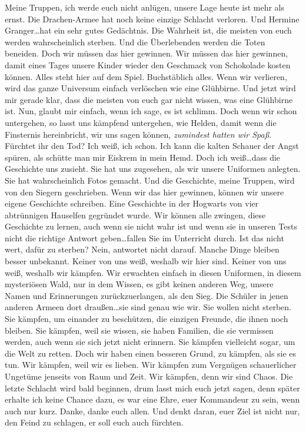 Meine Truppen, ich werde euch nicht anlügen, unsere Lage heute ist mehr als ernst. Die Drachen-Armee hat noch keine einzige Schlacht verloren. Und Hermine Granger…hat ein sehr gutes Gedächtnis. Die Wahrheit ist, die meisten von euch werden wahrscheinlich sterben. Und die Überlebenden werden die Toten beneiden. Doch wir müssen das hier gewinnen. Wir müssen das hier gewinnen, damit eines Tages unsere Kinder wieder den Geschmack von Schokolade kosten können. Alles steht hier auf dem Spiel. Buchstäblich alles. Wenn wir verlieren, wird das ganze Universum einfach verlöschen wie eine Glühbirne. Und jetzt wird mir gerade klar, dass die meisten von euch gar nicht wissen, was eine Glühbirne ist. Nun, glaubt mir einfach, wenn ich sage, es ist schlimm. Doch wenn wir schon untergehen, so lasst uns kämpfend untergehen, wie Helden, damit wenn die Finsternis hereinbricht, wir uns sagen können, \emph{zumindest hatten wir Spaß}. Fürchtet ihr den Tod? Ich weiß, ich schon. Ich kann die kalten Schauer der Angst spüren, als schütte man mir Eiskrem in mein Hemd. Doch ich weiß…dass die Geschichte uns zusieht. Sie hat uns zugesehen, als wir unsere Uniformen anlegten. Sie hat wahrscheinlich Fotos gemacht. Und die Geschichte, meine Truppen, wird von den Siegern geschrieben. Wenn wir das hier gewinnen, können wir unsere eigene Geschichte schreiben. Eine Geschichte in der Hogwarts von vier abtrünnigen Hauselfen gegründet wurde. Wir können alle zwingen, diese Geschichte zu lernen, auch wenn sie nicht wahr ist und wenn sie in unseren Tests nicht die richtige Antwort geben…fallen Sie im Unterricht durch. Ist das nicht wert, dafür zu sterben? Nein, antwortet nicht darauf. Manche Dinge bleiben besser unbekannt. Keiner von uns weiß, weshalb wir hier sind. Keiner von uns weiß, weshalb wir kämpfen. Wir erwachten einfach in diesen Uniformen, in diesem mysteriösen Wald, nur in dem Wissen, es gibt keinen anderen Weg, unsere Namen und Erinnerungen zurückzuerlangen, als den Sieg. Die Schüler in jenen anderen Armeen dort draußen…sie sind genau wie wir. Sie wollen nicht sterben. Sie kämpfen, um einander zu beschützen, die einzigen Freunde, die ihnen noch bleiben. Sie kämpfen, weil sie wissen, sie haben Familien, die sie vermissen werden, auch wenn sie sich jetzt nicht erinnern. Sie kämpfen vielleicht sogar, um die Welt zu retten. Doch wir haben einen besseren Grund, zu kämpfen, als sie es tun. Wir kämpfen, weil wir es lieben. Wir kämpfen zum Vergnügen schauerlicher Ungetüme jenseits von Raum und Zeit. Wir kämpfen, denn wir sind Chaos. Die letzte Schlacht wird bald beginnen, drum lasst mich euch jetzt sagen, denn später erhalte ich keine Chance dazu, es war eine Ehre, euer Kommandeur zu sein, wenn auch nur kurz. Danke, danke euch allen. Und denkt daran, euer Ziel ist nicht nur, den Feind zu schlagen, er soll euch auch fürchten.

